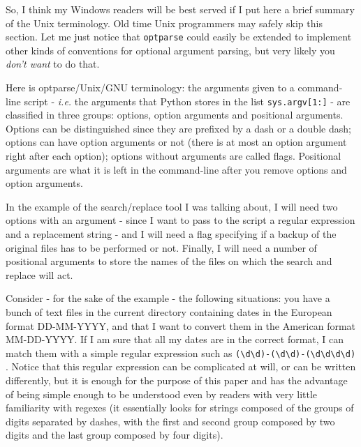 \documentclass[10pt,english]{article}
\begin{document}
So, I think my Windows readers will be best served if I put here
a brief summary of the Unix terminology. Old time Unix programmers may safely 
skip this section. Let me just notice that \texttt{optparse} could easily be 
extended to implement other kinds of conventions for optional argument 
parsing, but very likely you \emph{don't want} to do that.

Here is optparse/Unix/GNU terminology:
the arguments given to a command-line script - \emph{i.e.}  the arguments
that Python stores in the list \texttt{sys.argv[1:]} - are classified in
three groups: options, option arguments and positional arguments. 
Options can be distinguished since they are prefixed by a dash
or a double dash; options can have option arguments or not 
(there is at most an option argument right after each option); 
options without arguments are called flags. Positional arguments 
are what it is left in the command-line after you remove options 
and option arguments.

In the example of the search/replace tool I was
talking about, I will need two options with an argument - since I want 
to pass to the script a regular expression and a replacement string - 
and I will need a flag specifying if a backup of the original files has 
to be performed or not. Finally, I will need a number of positional
arguments to store the names of the files on which the search and
replace will act.

Consider - for the sake of the example - the following situations:
you have a bunch of text files in the current directory containing dates 
in the European format DD-MM-YYYY, and that I want to convert them in
the American format MM-DD-YYYY. If I am sure that all my dates
are in the correct format, I can match them with a simple regular
expression such as \texttt{({\textbackslash}d{\textbackslash}d)-({\textbackslash}d{\textbackslash}d)-({\textbackslash}d{\textbackslash}d{\textbackslash}d{\textbackslash}d)} . Notice that
this regular expression can be complicated at will, or can be 
written differently, but it is enough for the purpose of this 
paper and has the advantage of being simple enough to be
understood even by readers with very little familiarity with 
regexes (it essentially looks for strings composed of the
groups of digits separated by dashes, with the first and
second group composed by two digits and the last group
composed by four digits).
\end{document}
